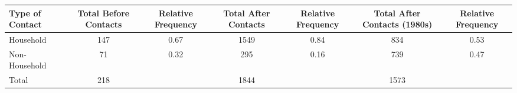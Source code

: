 
\begin{table}[!hb]
        \begin{tabular}{lcccccc} 
\toprule
Type of Contact & Total Before Contacts & Relative Frequency &	Total After Contacts &	Relative Frequency & Total After Contacts (1980s) & Relative Frequency \\
\midrule
Household & 147 & 0.67 & 1549 &	0.84 & 834 & 0.53 \\
Non-Household &	71 & 0.32 &	295	& 0.16 & 739 & 0.47 \\
Total &	218	& &	1844 &	& 1573 & \\
\bottomrule
\end{tabular}
\end{table}
